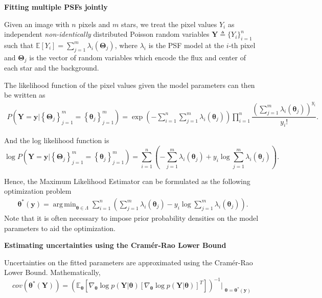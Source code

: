 \documentclass[landscape,a0b,final]{a0poster}
\DeclareMathOperator*{\argmin}{arg\,min}
\newenvironment{poster}{
  \begin{center}
  \begin{minipage}[c]{0.98\textwidth}
}{
  \end{minipage}
  \end{center}
}
\newenvironment{pcolumn}[1]{
  \begin{minipage}{#1\textwidth}
  \begin{center}
}{
  \end{center}
  \end{minipage}
}
\begin{document}
\begin{poster}
\begin{center}
\begin{pcolumn}{0.32}
{    \begin{center}
        \textbf{Fitting multiple PSFs jointly}
    \end{center}

    Given an image with $n$ pixels and $m$ stars, we treat the pixel values $Y_i$ as
    independent \emph{non-identically} distributed Poisson random variables $\bm{Y} \triangleq \{Y_i\}_{i=1}^{n}$
    such that $\mathbb{E}\left[Y_i\right] = \sum_{j=1}^{m}\lambda_i(\bm{\Theta}_j)$,
    where $\lambda_i$ is the PSF model at the $i$-th pixel and $\bm{\Theta}_j$ is the
    vector of random variables which encode the flux and center of each star and the background.

    The likelihood function of the pixel values given the model parameters can then be written as
\begin{align}
   P\left(\bm{Y} = \bm{y} \Bigr| \left\{\bm{\Theta}_j\right\}_{j=1}^{m} = \left\{\bm{\theta}_j\right\}_{j=1}^{m}\right) = \exp\left({-\sum_{i=1}^{n}\sum_{j=1}^{m}\lambda_i(\bm{\theta}_j)}\right)\prod_{i=1}^{n}\dfrac{\left(\sum_{j=1}^{m}\lambda_i\left(\bm{\theta}_j\right)\right)^{y_i}}{y_i!}.
\end{align}

And the log likelihood function is
\begin{equation}
    \log  P\left(\bm{Y} = \bm{y} \Bigr| \left\{\bm{\Theta}_j\right\}_{j=1}^{m} = \left\{\bm{\theta}_j\right\}_{j=1}^{m}\right) = \sum_{i=1}^{n}\left(- \sum_{j=1}^{m}\lambda_i(\bm{\theta}_j) + y_i\log\sum_{j=1}^{m}\lambda_i(\bm{\theta}_j)\right).
\end{equation}

    Hence, the Maximum Likelihood Estimator can be formulated as the following optimization problem
\begin{align}
    \bm{\theta}^{*}(\bm{y}) = \argmin_{\bm{\theta} \in \Lambda} \sum_{i=1}^{n}\left(\sum_{j=1}^{m}\lambda_i(\bm{\theta}_j) - y_i\log\sum_{j=1}^{m}\lambda_i(\bm{\theta}_j)\right).
\end{align}
Note that it is often necessary to impose prior probability densities on the model parameters
    to aid the optimization.

\vspace{0.75cm}
    \begin{center}
        \textbf{Estimating uncertainties using the Cram\'er-Rao Lower Bound}
    \end{center}

Uncertainties on the fitted parameters are approximated using the Cram\'er-Rao Lower Bound. Mathematically,
        \begin{equation}
            cov(\bm{\theta}^{*}(\bm{Y})) = \left(\mathbb{E}_{\bm{\theta}}\left[\nabla_{\bm{\theta}}\log p(\bm{Y} | \bm{\theta})\left[\nabla_{\bm{\theta}}\log p(\bm{Y} | \bm{\theta}) \right]^{T}  \right]\right)^{-1}\Bigr|_{\substack{\bm{\theta}=\bm{\theta}^{*}(\bm{y})}}
        \end{equation}

}
\end{pcolumn}
\end{center}
\end{poster}
\end{document}
